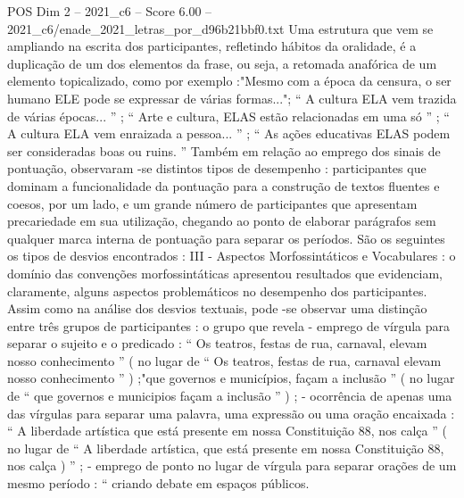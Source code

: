 \begin{textsample}{POS Dim 2 – 2021\_c6 – Score 6.00 – 2021\_c6/enade\_2021\_letras\_por\_d96b21bbf0.txt}
Uma estrutura que vem se ampliando na escrita dos participantes, refletindo hábitos da oralidade, é a duplicação de um dos elementos da frase, ou seja, a retomada anafórica de um elemento topicalizado, como por exemplo :"Mesmo com a época da censura, o ser humano ELE pode se expressar de várias formas..."; “ A cultura ELA vem trazida de várias épocas... ” ; “ Arte e cultura, ELAS estão relacionadas em uma só ” ; “ A cultura ELA vem enraizada a pessoa... ” ; “ As ações educativas ELAS podem ser consideradas boas ou ruins. ” Também em relação ao emprego dos sinais de pontuação, observaram -se distintos tipos de desempenho : participantes que dominam a funcionalidade da pontuação para a construção de textos fluentes e coesos, por um lado, e um grande número de participantes que apresentam precariedade em sua utilização, chegando ao ponto de elaborar parágrafos sem qualquer marca interna de pontuação para separar os períodos.
São os seguintes os tipos de desvios encontrados : III - Aspectos Morfossintáticos e Vocabulares : o domínio das convenções morfossintáticas apresentou resultados que evidenciam, claramente, alguns aspectos problemáticos no desempenho dos participantes.
Assim como na análise dos desvios textuais, pode -se observar uma distinção entre três grupos de participantes : o grupo que revela - emprego de vírgula para separar o sujeito e o predicado : “ Os teatros, festas de rua, carnaval, elevam nosso conhecimento ” ( no lugar de “ Os teatros, festas de rua, carnaval elevam nosso conhecimento ” ) ;"que governos e municípios, façam a inclusão ” ( no lugar de “ que governos e municipios façam a inclusão ” ) ; - ocorrência de apenas uma das vírgulas para separar uma palavra, uma expressão ou uma oração encaixada : “ A liberdade artística que está presente em nossa Constituição 88, nos calça ” ( no lugar de “ A liberdade artística, que está presente em nossa Constituição 88, nos calça ) ” ; - emprego de ponto no lugar de vírgula para separar orações de um mesmo período : “ criando debate em espaços públicos.

\end{textsample}
